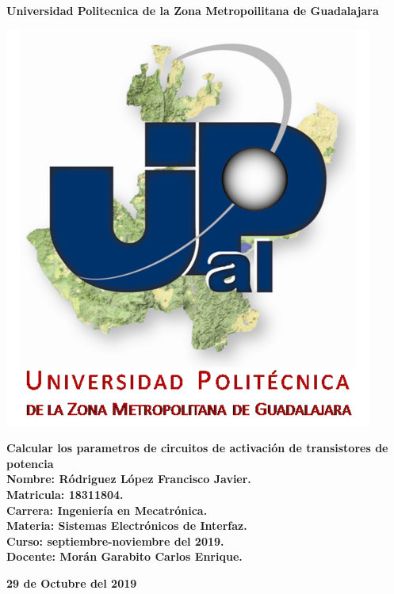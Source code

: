 \documentclass[12pt,a4paper]{article}
\author{Rodriguez Lopez Francisco Javier}
\begin{document}
\begin{center}
\LARGE \textbf{Universidad Politecnica de la Zona Metropoilitana de Guadalajara\\}

\includegraphics[scale=1]{Upzmg7.png} 

\large \textbf{Calcular los parametros de circuitos de activación de transistores de potencia}\\
\vspace{2cm}
\large \textbf{Nombre: Ródriguez López Francisco Javier.\\
\vspace{0.5cm} Matricula: 18311804.\\
\vspace{0.5cm} Carrera: Ingeniería en Mecatrónica.\\
\vspace{0.5cm} Materia: Sistemas Electrónicos de Interfaz.\\
\vspace{0.5cm} Curso: septiembre-noviembre del 2019.\\
\vspace{0.5cm} Docente: Morán Garabito Carlos Enrique.}


\vspace{6cm}
\small \textbf{29 de Octubre del 2019}
\end{center}
\end{document}
